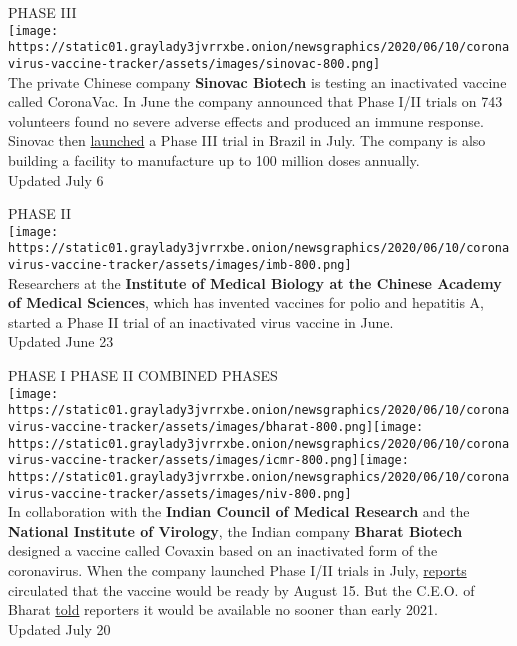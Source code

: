 PHASE III\\
\texttt{[image: https://static01.graylady3jvrrxbe.onion/newsgraphics/2020/06/10/coronavirus-vaccine-tracker/assets/images/sinovac-800.png]}\\
The private Chinese company \textbf{Sinovac Biotech} is testing an
inactivated vaccine called CoronaVac. In June the company announced that
Phase I/II trials on 743 volunteers found no severe adverse effects and
produced an immune response. Sinovac then
\href{http://www.sinovac.com/?optionid=754\&auto_id=907}{launched} a
Phase III trial in Brazil in July. The company is also building a
facility to manufacture up to 100 million doses annually.\\
Updated July 6

PHASE II\\
\texttt{[image: https://static01.graylady3jvrrxbe.onion/newsgraphics/2020/06/10/coronavirus-vaccine-tracker/assets/images/imb-800.png]}\\
Researchers at the \textbf{Institute of Medical Biology at the Chinese
Academy of Medical Sciences}, which has invented vaccines for polio and
hepatitis A, started a Phase II trial of an inactivated virus vaccine in
June.\\
Updated June 23

PHASE I PHASE II COMBINED PHASES\\
\texttt{[image: https://static01.graylady3jvrrxbe.onion/newsgraphics/2020/06/10/coronavirus-vaccine-tracker/assets/images/bharat-800.png]}\texttt{[image: https://static01.graylady3jvrrxbe.onion/newsgraphics/2020/06/10/coronavirus-vaccine-tracker/assets/images/icmr-800.png]}\texttt{[image: https://static01.graylady3jvrrxbe.onion/newsgraphics/2020/06/10/coronavirus-vaccine-tracker/assets/images/niv-800.png]}\\
In collaboration with the \textbf{Indian Council of Medical Research}
and the \textbf{National Institute of Virology}, the Indian company
\textbf{Bharat Biotech} designed a vaccine called Covaxin based on an
inactivated form of the coronavirus. When the company launched Phase
I/II trials in July,
\href{https://uk.reuters.com/article/uk-health-coronavirus-india-bharat-biote/health-experts-cast-doubt-on-indias-timeline-for-covid-vaccine-idUKKBN2440XD}{reports}
circulated that the vaccine would be ready by August 15. But the C.E.O.
of Bharat
\href{https://www.newindianexpress.com/nation/2020/jul/03/interview--covaxin-by-2021-if-all-goes-well-bharat-biotech-chairman-2164708.html}{told}
reporters it would be available no sooner than early 2021.\\
Updated July 20

